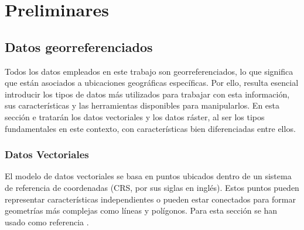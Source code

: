 \documentclass[12pt,a4paper,]{book}
\title{}
\author{Nombre Completo Autor}
\date{18/11/2021}
\def\ifdoblecara{} %
\def\ifprincipal{} %
\let\ifprincipal\undefined %
\numberwithin{dummy}{section}
\theoremstyle{ocrenumbox}
\theoremstyle{blacknumex}
\theoremstyle{blacknumbox}
\theoremstyle{ocrenum}
\theoremstyle{ocrenum}
\begin{document}




\raggedbottom

\ifdefined\ifprincipal
\else
\setlength{\parindent}{1em}
\pagestyle{fancy}
\setcounter{tocdepth}{4}
\tableofcontents

\fi

\ifdefined\ifdoblecara
\fancyhead{}{}
\fancyhead[LE,RO]{\scriptsize\rightmark}
\fancyfoot[LO,RE]{\scriptsize\slshape \leftmark}
\fancyfoot[C]{}
\fancyfoot[LE,RO]{\footnotesize\thepage}
\else
\fancyhead{}{}
\fancyhead[RO]{\scriptsize\rightmark}
\fancyfoot[LO]{\scriptsize\slshape \leftmark}
\fancyfoot[C]{}
\fancyfoot[RO]{\footnotesize\thepage}
\fi

\renewcommand{\headrulewidth}{0.4pt}
\renewcommand{\footrulewidth}{0.4pt}

\hypertarget{preliminares}{%
\chapter{Preliminares}\label{preliminares}}

\hypertarget{datos-georreferenciados}{%
\section{Datos georreferenciados}\label{datos-georreferenciados}}

Todos los datos empleados en este trabajo son georreferenciados, lo que
significa que están asociados a ubicaciones geográficas específicas. Por
ello, resulta esencial introducir los tipos de datos más utilizados para
trabajar con esta información, sus características y las herramientas
disponibles para manipularlos. En esta sección e tratarán los datos
vectoriales y los datos ráster, al ser los tipos fundamentales en este
contexto, con características bien diferenciadas entre ellos.

\hypertarget{datos-vectoriales}{%
\subsection{Datos Vectoriales}\label{datos-vectoriales}}

El modelo de datos vectoriales se basa en puntos ubicados dentro de un
sistema de referencia de coordenadas (CRS, por sus siglas en inglés).
Estos puntos pueden representar características independientes o pueden
estar conectados para formar geometrías más complejas como líneas y
polígonos. Para esta sección se han usado como referencia
\citet{lovelace_geocomputation_2019}.
\end{document}
